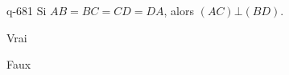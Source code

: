 \begin{truefalse}{q-681}
Si $AB=BC=CD=DA$, alors $(AC)\bot(BD)$.
\item* Vrai
\item Faux
\end{truefalse}


